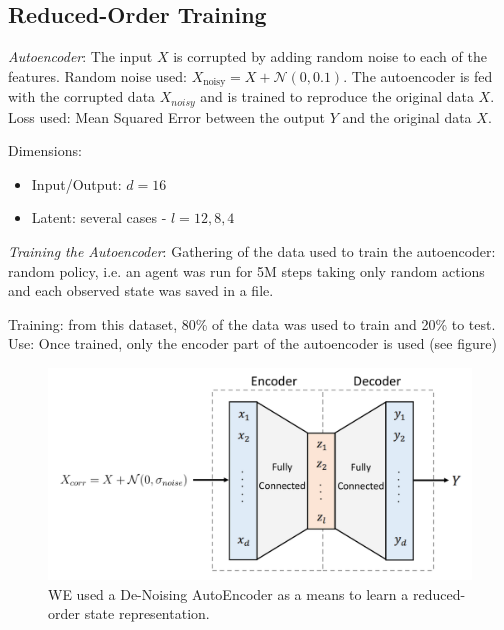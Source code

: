 \documentclass[letterpaper, 10 pt, conference]{ieeeconf}
\begin{document}
\subsection{Reduced-Order Training}

\emph{Autoencoder}: The input $X$ is corrupted by adding random noise to each of the features.
Random noise used: $X_\text{noisy} = X + \mathcal{N}(0, 0.1)$.
The autoencoder is fed with the corrupted data $X_{noisy}$ and is trained to reproduce the original data $X$.
Loss used: Mean Squared Error between the output $Y$ and the original data $X$.

Dimensions:
\begin{itemize}
    \item Input/Output: $d = 16$
    \item Latent: several cases - $l = 12,8,4$
\end{itemize}

\emph{Training the Autoencoder}: Gathering of the data used to train the autoencoder: random policy, i.e. an agent was run for 5M steps taking only random actions and each observed state was saved in a file.

Training: from this dataset, 80\% of the data was used to train and 20\% to test.
Use: Once trained, only the encoder part of the autoencoder is used (see figure)

\begin{figure}[ht]
    \centering
    \includegraphics[width=\linewidth]{fig-autoencoder}
    \caption{
        WE used a De-Noising AutoEncoder as a means to learn a reduced-order state representation.
    }
    \label{fig:autoencoder}
\end{figure}

\lipsum[1-7]
\end{document}
